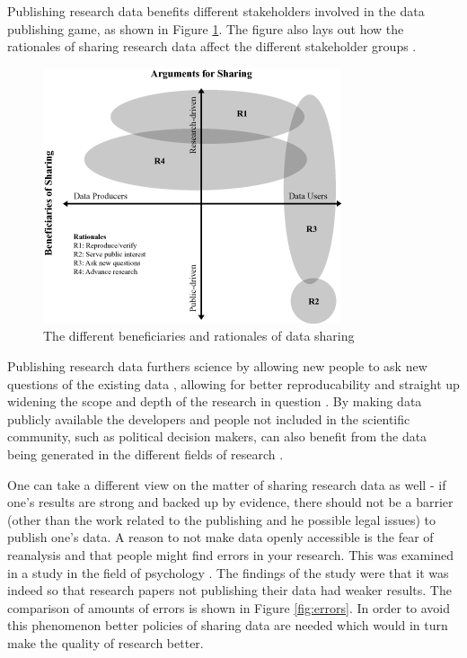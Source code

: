 Publishing research data benefits different stakeholders involved in the
data publishing game, as shown in Figure \ref{fig:beneficaries}. The figure
also lays out how the rationales of sharing research data affect the different
stakeholder groups \cite{DBLP:journals/jasis/Borgman12}.

\begin{figure}
    \begin{centering}
        \includegraphics[width=\textwidth]{images/beneficaries}
    \end{centering}
    \caption{The different beneficiaries and rationales of data sharing \cite{DBLP:journals/jasis/Borgman12}}
    \label{fig:beneficaries}
\end{figure}

Publishing research data furthers science by allowing new people to ask new
questions of the existing data \cite{whitlock2011data}, allowing for better
reproducability \cite{jasny2011again} and straight up widening the scope and
depth of the research in question \cite{DBLP:journals/see/FischerZ10}.
By making data publicly available the developers and people not included in the
scientific community, such as political decision makers, can also benefit from
the data being generated in the different fields of research
\cite{DBLP:journals/jasis/Borgman12}.

One can take a different view on the matter of sharing research data as well -
if one's results are strong and backed up by evidence, there should not be a
barrier (other than the work related to the publishing and he possible legal
issues) to publish one's data. A reason to not make data openly accessible is
the fear of reanalysis and that people might find errors in your research. This
was examined in a study in the field of psychology
\cite{wicherts2011willingness}. The findings of the study were that it was
indeed so that research papers not publishing their data had weaker results.
The comparison of amounts of errors is shown in Figure \ref{fig:errors}. In order
to avoid this phenomenon better policies of sharing data are needed which would
in turn make the quality of research better.


